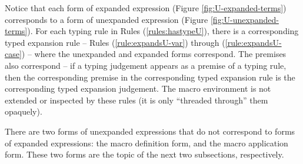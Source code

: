 Notice that each form of expanded expression (Figure \ref{fig:U-expanded-terms}) corresponds to a form of unexpanded expression (Figure \ref{fig:U-unexpanded-terms}). For each typing rule in Rules (\ref{rules:hastypeU}), there is a corresponding typed expansion rule -- Rules (\ref{rule:expandsU-var}) through (\ref{rule:expandsU-case}) -- where the unexpanded and expanded forms correspond. The premises also correspond -- if a typing judgement appears as a premise of a typing rule, then the corresponding premise in the corresponding typed expansion rule is the corresponding typed expansion judgement. The macro environment is not extended or inspected by these rules (it is only ``threaded through'' them opaquely).

There are two forms of unexpanded expressions that do not correspond to forms of expanded expressions: the macro definition form, and the macro application form. These two forms are the topic of the next two subsections, respectively.

